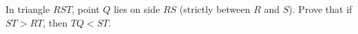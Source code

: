 In triangle $RST$, point $Q$ lies on side $RS$ (strictly between $R$ and $S$). Prove that if $ST>RT$, then $TQ<ST$.
